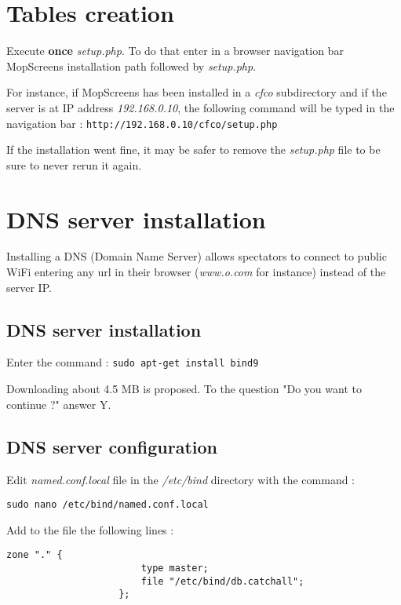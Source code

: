 \documentclass[a4paper]{ffco-rapport}
\begin{document}
\section{Tables creation}
	Execute {\bfseries once} \emph{setup.php}. To do that enter in a browser navigation bar MopScreens installation path followed by \emph{setup.php}.

	For instance, if MopScreens has been installed in a \emph{cfco} subdirectory and if the server is at IP address \emph{192.168.0.10}, the following command will be typed in the navigation bar : \verb|http://192.168.0.10/cfco/setup.php|
	
	If the installation went fine, it may be safer to remove the \emph{setup.php} file to be sure to never rerun it again.
	
\section{DNS server installation}
	Installing a DNS (Domain Name Server) allows spectators to connect to public WiFi entering any url in their browser (\emph{www.o.com} for instance) instead of the server IP.
	
	\subsection{DNS server installation}
		Enter the command : \verb|sudo apt-get install bind9|
	
		Downloading about 4.5 MB is proposed. To the question "Do you want to continue ?" answer Y.

	\subsection{DNS server configuration}
		Edit \emph{named.conf.local} file in the \emph{/etc/bind} directory with the command :
		
		\verb|sudo nano /etc/bind/named.conf.local|
		
		Add to the file the following lines :
		
		\lstset{tabsize=2}
		\begin{center}
			\ttfamily
			\begin{minipage}{8cm}
				\begin{lstlisting}[basicstyle=\small,language={},gobble=10]
					zone "." {
						type master;
						file "/etc/bind/db.catchall";
					};
				\end{lstlisting}
			\end{minipage}
		\end{center}
\end{document}
